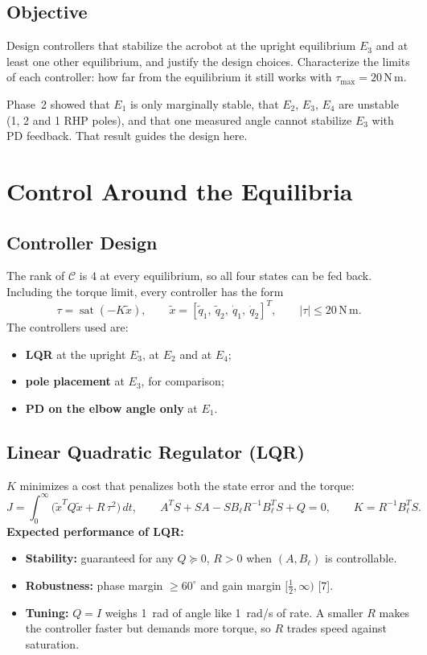 \documentclass[12pt,a4paper]{article}
\newcommand{\Nm}{\,\mathrm{N\,m}}
\begin{document}
\subsection{Objective}
Design controllers that stabilize the acrobot at the upright equilibrium $E_3$ and at least one other equilibrium, and justify the design choices. Characterize the limits of each controller: how far from the equilibrium it still works with $\tau_{\max}=20\Nm$.

Phase~2 showed that $E_1$ is only marginally stable, that $E_2$, $E_3$, $E_4$ are unstable (1, 2 and 1 RHP poles), and that one measured angle cannot stabilize $E_3$ with PD feedback. That result guides the design here.

\section{Control Around the Equilibria}
\subsection{Controller Design}
The rank of $\mathcal C$ is 4 at every equilibrium, so all four states can be fed back. Including the torque limit, every controller has the form
\begin{equation}
\tau=\operatorname{sat}(-K\tilde x),\qquad \tilde x=[\tilde q_1,\ \tilde q_2,\ \dot q_1,\ \dot q_2]^T,\qquad |\tau|\le20\Nm .
\end{equation}
The controllers used are:
\begin{itemize}
\item \textbf{LQR} at the upright $E_3$, at $E_2$ and at $E_4$;
\item \textbf{pole placement} at $E_3$, for comparison;
\item \textbf{PD on the elbow angle only} at $E_1$.
\end{itemize}

\subsection{Linear Quadratic Regulator (LQR)}
$K$ minimizes a cost that penalizes both the state error and the torque:
\begin{equation}
J=\int_0^\infty\big(\tilde x^TQ\tilde x+R\,\tau^2\big)\,dt,\qquad A^TS+SA-SB_\ell R^{-1}B_\ell^TS+Q=0,\qquad K=R^{-1}B_\ell^TS .
\end{equation}
\textbf{Expected performance of LQR:}
\begin{itemize}
\item \textbf{Stability:} guaranteed for any $Q\succeq0$, $R>0$ when $(A,B_\ell)$ is controllable.
\item \textbf{Robustness:} phase margin $\ge60^\circ$ and gain margin $[\frac12,\infty)$ [7].
\item \textbf{Tuning:} $Q=I$ weighs 1~rad of angle like 1~rad/s of rate. A smaller $R$ makes the controller faster but demands more torque, so $R$ trades speed against saturation.
\end{itemize}
\end{document}
